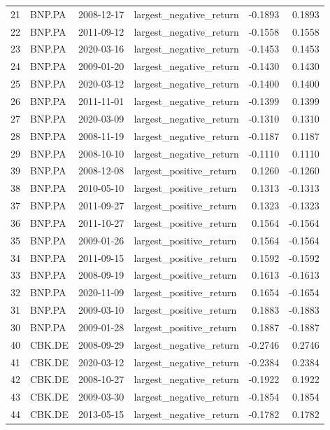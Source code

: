 \begin{table}
\begin{tabular}{llllrr}
21 & BNP.PA & 2008-12-17 & largest_negative_return & -0.1893 & 0.1893 \\
22 & BNP.PA & 2011-09-12 & largest_negative_return & -0.1558 & 0.1558 \\
23 & BNP.PA & 2020-03-16 & largest_negative_return & -0.1453 & 0.1453 \\
24 & BNP.PA & 2009-01-20 & largest_negative_return & -0.1430 & 0.1430 \\
25 & BNP.PA & 2020-03-12 & largest_negative_return & -0.1400 & 0.1400 \\
26 & BNP.PA & 2011-11-01 & largest_negative_return & -0.1399 & 0.1399 \\
27 & BNP.PA & 2020-03-09 & largest_negative_return & -0.1310 & 0.1310 \\
28 & BNP.PA & 2008-11-19 & largest_negative_return & -0.1187 & 0.1187 \\
29 & BNP.PA & 2008-10-10 & largest_negative_return & -0.1110 & 0.1110 \\
39 & BNP.PA & 2008-12-08 & largest_positive_return & 0.1260 & -0.1260 \\
38 & BNP.PA & 2010-05-10 & largest_positive_return & 0.1313 & -0.1313 \\
37 & BNP.PA & 2011-09-27 & largest_positive_return & 0.1323 & -0.1323 \\
36 & BNP.PA & 2011-10-27 & largest_positive_return & 0.1564 & -0.1564 \\
35 & BNP.PA & 2009-01-26 & largest_positive_return & 0.1564 & -0.1564 \\
34 & BNP.PA & 2011-09-15 & largest_positive_return & 0.1592 & -0.1592 \\
33 & BNP.PA & 2008-09-19 & largest_positive_return & 0.1613 & -0.1613 \\
32 & BNP.PA & 2020-11-09 & largest_positive_return & 0.1654 & -0.1654 \\
31 & BNP.PA & 2009-03-10 & largest_positive_return & 0.1883 & -0.1883 \\
30 & BNP.PA & 2009-01-28 & largest_positive_return & 0.1887 & -0.1887 \\
40 & CBK.DE & 2008-09-29 & largest_negative_return & -0.2746 & 0.2746 \\
41 & CBK.DE & 2020-03-12 & largest_negative_return & -0.2384 & 0.2384 \\
42 & CBK.DE & 2008-10-27 & largest_negative_return & -0.1922 & 0.1922 \\
43 & CBK.DE & 2009-03-30 & largest_negative_return & -0.1854 & 0.1854 \\
44 & CBK.DE & 2013-05-15 & largest_negative_return & -0.1782 & 0.1782 \\

\end{tabular}
\end{table}
